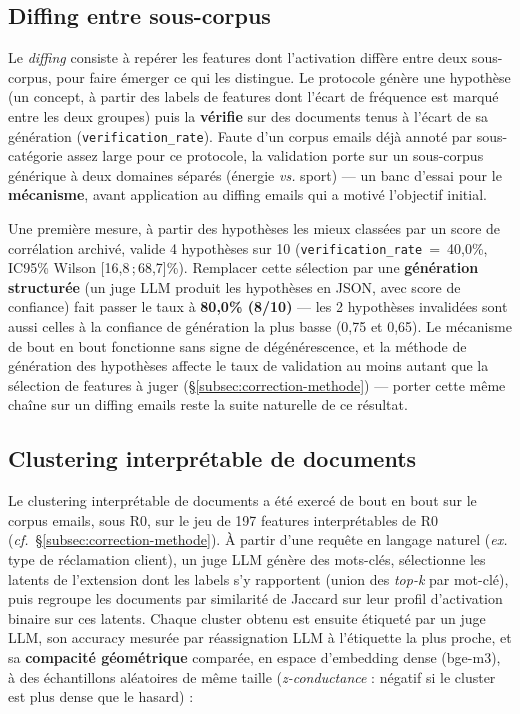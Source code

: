 \documentclass[11pt]{article}
\begin{document}
\subsection{Diffing entre sous-corpus}
\label{subsec:diffing}

Le \emph{diffing} consiste à repérer les features dont l'activation diffère entre
deux sous-corpus, pour faire émerger ce qui les distingue.
Le protocole génère une hypothèse (un concept, à partir des labels de
features dont l'écart de fréquence est marqué entre les deux groupes) puis la
\textbf{vérifie} sur des documents tenus à l'écart de sa génération
(\texttt{verification\_rate}). Faute d'un corpus emails déjà annoté par
sous-catégorie assez large pour ce protocole, la validation porte sur un
sous-corpus générique à deux domaines séparés (énergie \emph{vs.} sport) ---
un banc d'essai pour le \textbf{mécanisme}, avant application au diffing
emails qui a motivé l'objectif initial.

Une première mesure, à partir des hypothèses les mieux classées par un score
de corrélation archivé, valide 4 hypothèses sur 10
(\texttt{verification\_rate}~=~40,0\%, IC95\% Wilson [16,8\,;\,68,7]\%).
Remplacer cette sélection par une \textbf{génération structurée} (un juge LLM
produit les hypothèses en JSON, avec score de confiance) fait passer le taux
à \textbf{80,0\% (8/10)} --- les 2 hypothèses invalidées sont aussi celles à
la confiance de génération la plus basse (0,75 et 0,65). Le mécanisme de bout
en bout fonctionne sans signe de dégénérescence, et la méthode de génération
des hypothèses affecte le taux de validation au moins autant que la sélection
de features à juger (\S\ref{subsec:correction-methode}) --- porter cette
même chaîne sur un diffing emails reste la suite naturelle de ce résultat.

\subsection{Clustering interprétable de documents}

\label{subsec:clustering}

Le clustering interprétable de documents a été exercé de bout en bout sur le
corpus emails, sous R0, sur le jeu de 197 features interprétables de R0
(\emph{cf.}~\S\ref{subsec:correction-methode}). À partir d'une requête en
langage naturel (\emph{ex.} \og{}type de réclamation client\fg{}), un juge
LLM génère des mots-clés, sélectionne les latents de l'extension dont les
labels s'y rapportent (union des \emph{top-k} par mot-clé), puis regroupe
les documents par similarité de Jaccard sur leur profil d'activation binaire
sur ces latents. Chaque cluster obtenu est ensuite étiqueté par un juge LLM,
son accuracy mesurée par réassignation LLM à l'étiquette la plus proche, et
sa \textbf{compacité géométrique} comparée, en espace d'embedding dense
(bge-m3), à des échantillons aléatoires de même taille (\emph{z-conductance} :
négatif si le cluster est plus dense que le hasard) :
\end{document}
